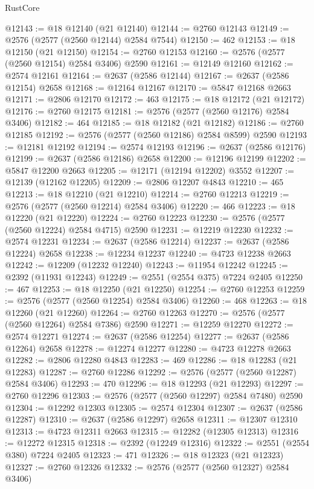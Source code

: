 \begin{lexlean}{RustCore}
\begin{coremodule}
@12143 := @18 @12140 (@21 @12140)
@12144 := @2760 @12143
@12149 := @2576 (@2577 (@2560 @12144) @2584 @7544)
@12150 := 462
@12153 := @18 @12150 (@21 @12150)
@12154 := @2760 @12153
@12160 := @2576 (@2577 (@2560 @12154) @2584 @3406) @2590
@12161 := @12149 @12160
@12162 := @2574 @12161
@12164 := @2637 (@2586 @12144)
@12167 := @2637 (@2586 @12154) @2658
@12168 := @12164 @12167
@12170 := @5847 @12168 @2663
@12171 := @2806 @12170
@12172 := 463
@12175 := @18 @12172 (@21 @12172)
@12176 := @2760 @12175
@12181 := @2576 (@2577 (@2560 @12176) @2584 @3406)
@12182 := 464
@12185 := @18 @12182 (@21 @12182)
@12186 := @2760 @12185
@12192 := @2576 (@2577 (@2560 @12186) @2584 @8599) @2590
@12193 := @12181 @12192
@12194 := @2574 @12193
@12196 := @2637 (@2586 @12176)
@12199 := @2637 (@2586 @12186) @2658
@12200 := @12196 @12199
@12202 := @5847 @12200 @2663
@12205 := @12171 (@12194 @12202) @3552
@12207 := @12139 (@12162 @12205)
@12209 := @2806 @12207 @4843
@12210 := 465
@12213 := @18 @12210 (@21 @12210)
@12214 := @2760 @12213
@12219 := @2576 (@2577 (@2560 @12214) @2584 @3406)
@12220 := 466
@12223 := @18 @12220 (@21 @12220)
@12224 := @2760 @12223
@12230 := @2576 (@2577 (@2560 @12224) @2584 @4715) @2590
@12231 := @12219 @12230
@12232 := @2574 @12231
@12234 := @2637 (@2586 @12214)
@12237 := @2637 (@2586 @12224) @2658
@12238 := @12234 @12237
@12240 := @4723 @12238 @2663
@12242 := @12209 (@12232 @12240)
@12243 := @11954 @12242
@12245 := @2392 (@11931 @12243)
@12249 := @2551 (@2554 @375) @7224 @2405
@12250 := 467
@12253 := @18 @12250 (@21 @12250)
@12254 := @2760 @12253
@12259 := @2576 (@2577 (@2560 @12254) @2584 @3406)
@12260 := 468
@12263 := @18 @12260 (@21 @12260)
@12264 := @2760 @12263
@12270 := @2576 (@2577 (@2560 @12264) @2584 @7386) @2590
@12271 := @12259 @12270
@12272 := @2574 @12271
@12274 := @2637 (@2586 @12254)
@12277 := @2637 (@2586 @12264) @2658
@12278 := @12274 @12277
@12280 := @4723 @12278 @2663
@12282 := @2806 @12280 @4843
@12283 := 469
@12286 := @18 @12283 (@21 @12283)
@12287 := @2760 @12286
@12292 := @2576 (@2577 (@2560 @12287) @2584 @3406)
@12293 := 470
@12296 := @18 @12293 (@21 @12293)
@12297 := @2760 @12296
@12303 := @2576 (@2577 (@2560 @12297) @2584 @7480) @2590
@12304 := @12292 @12303
@12305 := @2574 @12304
@12307 := @2637 (@2586 @12287)
@12310 := @2637 (@2586 @12297) @2658
@12311 := @12307 @12310
@12313 := @4723 @12311 @2663
@12315 := @12282 (@12305 @12313)
@12316 := @12272 @12315
@12318 := @2392 (@12249 @12316)
@12322 := @2551 (@2554 @380) @7224 @2405
@12323 := 471
@12326 := @18 @12323 (@21 @12323)
@12327 := @2760 @12326
@12332 := @2576 (@2577 (@2560 @12327) @2584 @3406)

\end{coremodule}
\end{lexlean}
